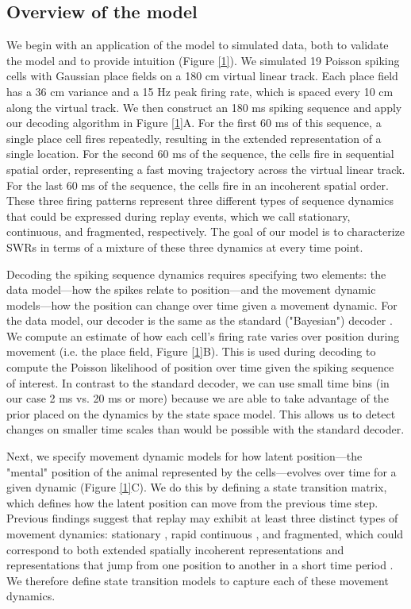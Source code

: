 \documentclass[times, twoside]{zHenriquesLab-StyleBioRxiv}
\begin{document}
\subsection*{Overview of the model}
We begin with an application of the model to simulated data, both to validate the model and to provide intuition (Figure \ref{1}). We simulated 19 Poisson spiking cells with Gaussian place fields on a 180 cm virtual linear track. Each place field has a 36 cm variance and a 15 Hz peak firing rate, which is spaced every 10 cm along the virtual track. We then construct an 180 ms spiking sequence and apply our decoding algorithm in Figure \ref{1}A. For the first 60 ms of this sequence, a single place cell fires repeatedly, resulting in the extended representation of a single location. For the second 60 ms of the sequence, the cells fire in sequential spatial order, representing a fast moving trajectory across the virtual linear track. For the last 60 ms of the sequence, the cells fire in an incoherent spatial order. These three firing patterns represent three different types of sequence dynamics that could be expressed during replay events, which we call stationary, continuous, and fragmented, respectively. The goal of our model is to characterize SWRs in terms of a mixture of these three dynamics at every time point.

Decoding the spiking sequence dynamics requires specifying two elements: the data model---how the spikes relate to position---and the movement dynamic models---how the position can change over time given a movement dynamic. For the data model, our decoder is the same as the standard ("Bayesian") decoder \cite{DavidsonHippocampalReplayExtended2009, PfeifferAutoassociativedynamicsgeneration2015, StellaHippocampalReactivationRandom2019}. We compute an estimate of how each cell's firing rate varies over position during movement (i.e. the place field, Figure \ref{1}B). This is used during decoding to compute the Poisson likelihood of position over time given the spiking sequence of interest. In contrast to the standard decoder, we can use small time bins (in our case 2 ms vs. 20 ms or more) because we are able to take advantage of the prior placed on the dynamics by the state space model. This allows us to detect changes on smaller time scales than would be possible with the standard decoder.

Next, we specify movement dynamic models for how latent position---the "mental" position of the animal represented by the cells---evolves over time for a given dynamic (Figure \ref{1}C). We do this by defining a state transition matrix, which defines how the latent position can move from the previous time step. Previous findings suggest that replay may exhibit at least three distinct types of movement dynamics: stationary \cite{JaiDistincthippocampalcorticalmemory2017, FarooqEmergencepreconfiguredplastic2019}, rapid continuous \cite{DavidsonHippocampalReplayExtended2009}, and fragmented, which could correspond to both extended spatially incoherent representations and representations that jump from one position to another in a short time period \cite{PfeifferAutoassociativedynamicsgeneration2015}. We therefore define state transition models to capture each of these movement dynamics.
\end{document}
